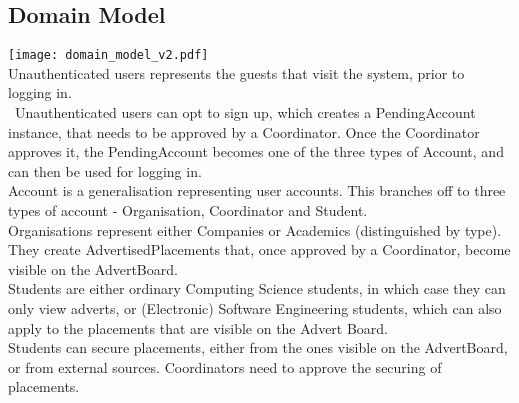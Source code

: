 \documentclass{l3deliverable}
\begin{document}
\subsection{Domain Model}
\texttt{[image: domain\_model\_v2.pdf]}\\
Unauthenticated users represents the guests that visit the system, prior to logging in.\\\
Unauthenticated users can opt to sign up, which creates a PendingAccount instance, that needs to be approved by a Coordinator. Once the Coordinator approves it, the PendingAccount becomes one of the three types of Account, and can then be used for logging in.\\

Account is a generalisation representing user accounts. This branches off to three types of account - Organisation, Coordinator and Student.\\

Organisations represent either Companies or Academics (distinguished by type). They create AdvertisedPlacements that, once approved by a Coordinator, become visible on the AdvertBoard.\\

Students are either ordinary Computing Science students, in which case they can only view adverts, or (Electronic) Software Engineering students, which can also apply to the placements that are visible on the Advert Board.\\

Students can secure placements, either from the ones visible on the AdvertBoard, or from external sources. Coordinators need to approve the securing of placements.


\newpage
\end{document}
